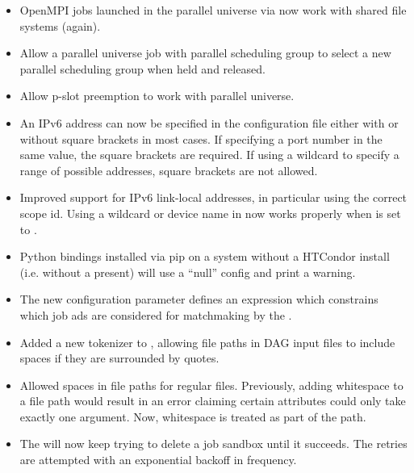 \begin{itemize}
\item OpenMPI jobs launched in the parallel universe via 
now work with shared file systems (again).

\item Allow a parallel universe job with parallel scheduling group to
select a new parallel scheduling group when held and released.

\item Allow p-slot preemption to work with parallel universe.

\item An IPv6 address can now be specified in the configuration file
either with or without square brackets in most cases.
If specifying a port number in the same value, the square brackets are
required.
If using a wildcard to specify a range of possible addresses, square
brackets are not allowed.

\item Improved support for IPv6 link-local addresses, in particular
using the correct scope id.
Using a wildcard or device name in  now
works properly when  is set to .

\item Python bindings installed via pip on a system without a
HTCondor install (i.e. without a  present)
will use a ``null'' config and print a warning.

\item The new configuration parameter 
defines an expression which constrains which job ads are considered for
matchmaking by the .

\item Added a new tokenizer to , allowing file paths in DAG input
files to include spaces if they are surrounded by quotes. 

\item Allowed spaces in file paths for regular  files.
Previously, adding whitespace to a file path would result in an error claiming
certain attributes could only take exactly one argument. Now, whitespace is 
treated as part of the path.

\item The  will now keep trying to delete a job sandbox until it succeeds.
The retries are attempted with an exponential backoff in frequency.


\end{itemize}
